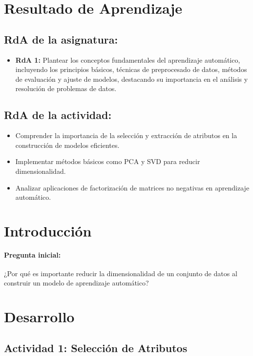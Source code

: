 \documentclass[a4,11pt]{aleph-notas}
\begin{document}
\encabezado


\section*{Resultado de Aprendizaje}

\subsection*{RdA de la asignatura:}
\begin{itemize}[leftmargin=*]
    \item \textbf{RdA 1:} 
    Plantear los conceptos fundamentales del aprendizaje automático, incluyendo los principios básicos, técnicas de preprocesado de datos, métodos de evaluación y ajuste de modelos, destacando su importancia en el análisis y resolución de problemas de datos.
\end{itemize}

\subsection*{RdA de la actividad:}
    \begin{itemize}[leftmargin=*]
        \item Comprender la importancia de la selección y extracción de atributos en la construcción de modelos eficientes.
        \item Implementar métodos básicos como PCA y SVD para reducir dimensionalidad.
        \item Analizar aplicaciones de factorización de matrices no negativas en aprendizaje automático.
    \end{itemize}

\section*{Introducción}

\paragraph{Pregunta inicial:} 
¿Por qué es importante reducir la dimensionalidad de un conjunto de datos al construir un modelo de aprendizaje automático?


\section*{Desarrollo}

\subsection*{Actividad 1: Selección de Atributos}
\end{document}
